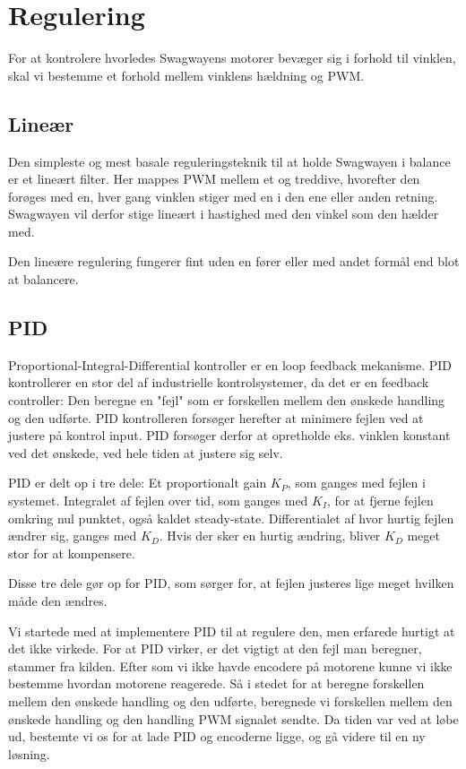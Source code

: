 \documentclass[a4paper,oneside,article,danish,table]{memoir}
\begin{document}
\section{Regulering}
For at kontrolere hvorledes Swagwayens motorer bevæger sig i forhold til vinklen, skal vi bestemme et forhold mellem vinklens hældning og PWM. 
\subsection{Lineær}
Den simpleste og mest basale reguleringsteknik til at holde Swagwayen i balance er et lineært filter. Her mappes PWM mellem et og treddive, hvorefter den forøges med en, hver gang vinklen stiger med en i den ene eller anden retning. Swagwayen vil derfor stige lineært i hastighed med den vinkel som den hælder med.

Den lineære regulering fungerer fint uden en fører eller med andet formål end blot at balancere.
\subsection{PID}
Proportional-Integral-Differential kontroller er en loop feedback mekanisme. PID kontrollerer en stor del af industrielle kontrolsystemer, da det er en feedback controller: Den beregne en "fejl" som er forskellen mellem den ønskede handling og den udførte. PID kontrolleren forsøger herefter at minimere fejlen ved at justere på kontrol input. PID forsøger derfor at opretholde eks. vinklen konstant ved det ønskede, ved hele tiden at justere sig selv. 

PID er delt op i tre dele: 
Et proportionalt gain $K_P$, som ganges med fejlen i systemet.
Integralet af fejlen over tid, som ganges med $K_I$, for at fjerne fejlen omkring nul punktet, også kaldet steady-state.
Differentialet af hvor hurtig fejlen ændrer sig, ganges med $K_D$. Hvis der sker en hurtig ændring, bliver $K_D$ meget stor for at kompensere.

Disse tre dele gør op for PID, som sørger for, at fejlen justeres lige meget hvilken måde den ændres.

Vi startede med at implementere PID til at regulere den, men erfarede hurtigt at det ikke virkede. For at PID virker, er det vigtigt at den fejl man beregner, stammer fra kilden. Efter som vi ikke havde encodere på motorene kunne vi ikke bestemme hvordan motorene reagerede. Så i stedet for at beregne forskellen mellem den ønskede handling og den udførte, beregnede vi forskellen mellem den ønskede handling og den handling PWM signalet sendte. Da tiden var ved at løbe ud, bestemte vi os for at lade PID og encoderne ligge, og gå videre til en ny løsning.
\end{document}
